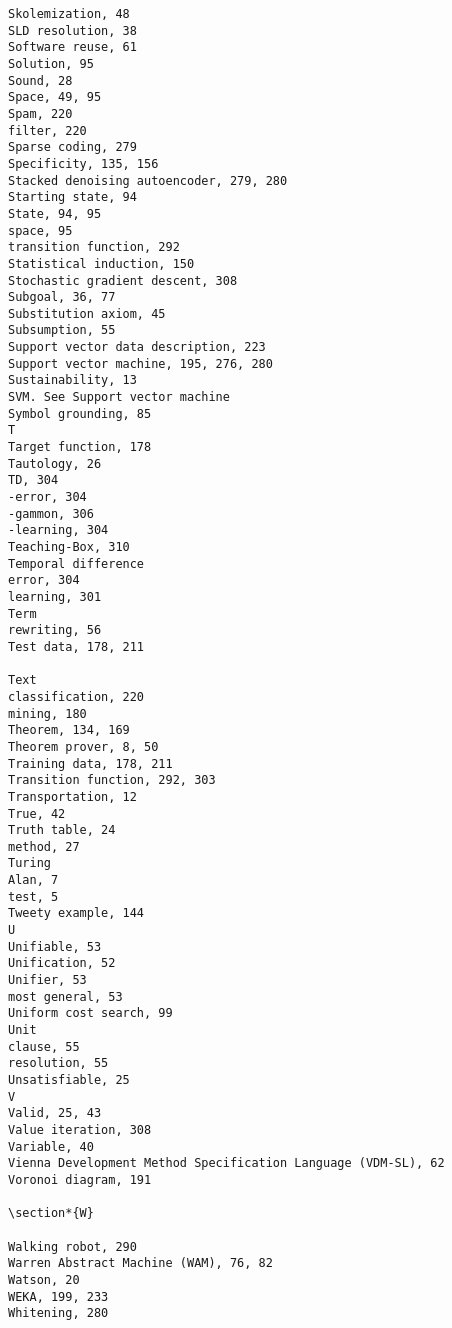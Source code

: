\documentclass[10pt]{article}
\begin{document}
\begin{verbatim}
Skolemization, 48
SLD resolution, 38
Software reuse, 61
Solution, 95
Sound, 28
Space, 49, 95
Spam, 220
filter, 220
Sparse coding, 279
Specificity, 135, 156
Stacked denoising autoencoder, 279, 280
Starting state, 94
State, 94, 95
space, 95
transition function, 292
Statistical induction, 150
Stochastic gradient descent, 308
Subgoal, 36, 77
Substitution axiom, 45
Subsumption, 55
Support vector data description, 223
Support vector machine, 195, 276, 280
Sustainability, 13
SVM. See Support vector machine
Symbol grounding, 85
T
Target function, 178
Tautology, 26
TD, 304
-error, 304
-gammon, 306
-learning, 304
Teaching-Box, 310
Temporal difference
error, 304
learning, 301
Term
rewriting, 56
Test data, 178, 211

Text
classification, 220
mining, 180
Theorem, 134, 169
Theorem prover, 8, 50
Training data, 178, 211
Transition function, 292, 303
Transportation, 12
True, 42
Truth table, 24
method, 27
Turing
Alan, 7
test, 5
Tweety example, 144
U
Unifiable, 53
Unification, 52
Unifier, 53
most general, 53
Uniform cost search, 99
Unit
clause, 55
resolution, 55
Unsatisfiable, 25
V
Valid, 25, 43
Value iteration, 308
Variable, 40
Vienna Development Method Specification Language (VDM-SL), 62
Voronoi diagram, 191

\section*{W}

Walking robot, 290
Warren Abstract Machine (WAM), 76, 82
Watson, 20
WEKA, 199, 233
Whitening, 280
\end{verbatim}
\end{document}
